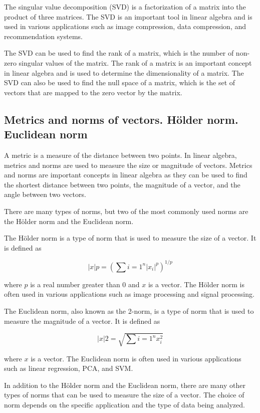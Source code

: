 \documentclass[12pt, a4paper, oneside]{article}
\begin{document}
The singular value decomposition (SVD) is a factorization of a matrix into the product of three matrices. The SVD is an important tool in linear algebra and is used in various applications such as image compression, data compression, and recommendation systems.

The SVD can be used to find the rank of a matrix, which is the number of non-zero singular values of the matrix. The rank of a matrix is an important concept in linear algebra and is used to determine the dimensionality of a matrix. The SVD can also be used to find the null space of a matrix, which is the set of vectors that are mapped to the zero vector by the matrix.





\subsection{ Metrics and norms of vectors. Hölder norm. Euclidean norm }
A metric is a measure of the distance between two points. In linear algebra, metrics and norms are used to measure the size or magnitude of vectors. Metrics and norms are important concepts in linear algebra as they can be used to find the shortest distance between two points, the magnitude of a vector, and the angle between two vectors.

There are many types of norms, but two of the most commonly used norms are the Hölder norm and the Euclidean norm.

The Hölder norm is a type of norm that is used to measure the size of a vector. It is defined as

$$\left|x\right|p = \left(\sum\limits{i=1}^{n} \left|x_i\right|^p\right)^{1/p}$$

where $p$ is a real number greater than 0 and $x$ is a vector. The Hölder norm is often used in various applications such as image processing and signal processing.

The Euclidean norm, also known as the 2-norm, is a type of norm that is used to measure the magnitude of a vector. It is defined as

$$\left|x\right|2 = \sqrt{\sum\limits{i=1}^{n} x_i^2}$$

where $x$ is a vector. The Euclidean norm is often used in various applications such as linear regression, PCA, and SVM.

In addition to the Hölder norm and the Euclidean norm, there are many other types of norms that can be used to measure the size of a vector. The choice of norm depends on the specific application and the type of data being analyzed.
\end{document}
